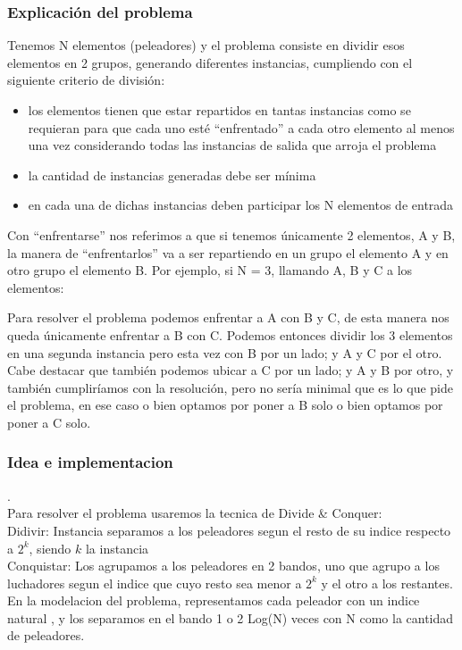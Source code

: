\subsubsection{Explicación del problema}
\noindent Tenemos N elementos (peleadores) y el problema consiste en dividir esos elementos en 2 grupos, generando diferentes instancias, cumpliendo con el siguiente criterio de división:
\begin{itemize}
\item los elementos tienen que estar repartidos en tantas instancias como se requieran para que cada uno esté “enfrentado” a cada otro elemento al menos una vez considerando todas las instancias de salida que arroja el problema
\item la cantidad de instancias generadas debe ser mínima
\item en cada una de dichas instancias deben participar los N elementos de entrada
\end{itemize}
Con “enfrentarse” nos referimos a que si tenemos únicamente 2 elementos, A y B, la manera de “enfrentarlos” va a ser repartiendo en un grupo el elemento A y en otro grupo el elemento B.
Por ejemplo, si N = 3, llamando A, B y C a los elementos: 

Para resolver el problema podemos enfrentar a A con B y C, de esta manera nos queda únicamente enfrentar a B con C. Podemos entonces dividir los 3 elementos en una segunda instancia pero esta vez con B por un lado; y A y C por el otro. Cabe destacar que también podemos ubicar a C por un lado; y A y B por otro, y también cumpliríamos con la resolución, pero no sería minimal que es lo que pide el problema, en ese caso o bien optamos por poner a B solo o bien optamos por poner a C solo.
\subsubsection{Idea e implementacion}
.\\
Para resolver el problema usaremos la tecnica de Divide \& Conquer: \\
	Didivir: Instancia separamos a los peleadores segun el resto de su indice respecto a $2^k$, siendo $k$ la instancia \\
	Conquistar: Los agrupamos a los peleadores en 2 bandos, uno que agrupo a los luchadores segun el indice que cuyo resto sea menor a $2^k$ y el otro a los restantes. \\

 En la modelacion del problema, representamos cada peleador con un indice natural , y los separamos en el bando 1 o 2 Log(N) veces con N como la cantidad de peleadores.

